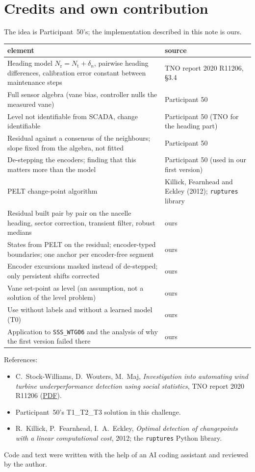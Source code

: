 \documentclass[11pt,a4paper]{article}
\theoremstyle{remark}
\newcommand{\code}[1]{\texttt{#1}}
\newcommand{\Nt}{N_{\mathrm{t}}}
\newcommand{\Nr}{N_{\mathrm{r}}}
\begin{document}
\section{Credits and own contribution}\label{sec:credits}
The idea is Participant~50's; the implementation described in this note is
ours.
\begin{center}\small
\begin{tabular}{@{}p{9.6cm}p{5.6cm}@{}}
\toprule
element & source \\
\midrule
Heading model $\Nr=\Nt+\delta_n$, pairwise heading differences, calibration error constant between maintenance steps & TNO report 2020 R11206, \S3.4 \\
Full sensor algebra (vane bias, controller nulls the measured vane) & Participant 50 \\
Level not identifiable from SCADA, change identifiable & Participant 50 (TNO for the heading part) \\
Residual against a consensus of the neighbours; slope fixed from the algebra, not fitted & Participant 50 \\
De-stepping the encoders; finding that this matters more than the model & Participant 50 (used in our first version) \\
PELT change-point algorithm & Killick, Fearnhead and Eckley (2012); \code{ruptures} library \\
\midrule
Residual built pair by pair on the nacelle heading, sector correction, transient filter, robust medians & ours \\
States from PELT on the residual; encoder-typed boundaries; one anchor per encoder-free segment & ours \\
Encoder excursions masked instead of de-stepped; only persistent shifts corrected & ours \\
Vane set-point as level (an assumption, not a solution of the level problem) & ours \\
Use without labels and without a learned model (T0) & ours \\
Application to \code{SSS\_WTG06} and the analysis of why the first version failed there & ours \\
\bottomrule
\end{tabular}
\end{center}

\noindent References:
\begin{itemize}
\item C.~Stock-Williams, D.~Wouters, M.~Maj, \emph{Investigation into automating
      wind turbine underperformance detection using social statistics}, TNO
      report 2020 R11206
      (\href{https://publications.tno.nl/publication/34637217/7RLl98/TNO-2020-R11206.pdf}{PDF}).
\item Participant~50's T1\_T2\_T3 solution in this challenge.
\item R.~Killick, P.~Fearnhead, I.~A.~Eckley, \emph{Optimal detection of
      changepoints with a linear computational cost}, 2012; the
      \code{ruptures} Python library.
\end{itemize}

\noindent Code and text were written with the help of an AI coding assistant
and reviewed by the author.
\end{document}
